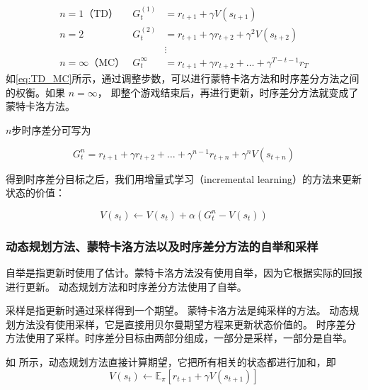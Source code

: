 \begin{equation}
	\label{eq:TD_MC}
	\begin{array}{lcl}
		n=1\text{（TD）} &G_{t}^{(1)}&=r_{t+1}+\gamma V\left(s_{t+1}\right) \\
		n=2 &G_{t}^{(2)}&= r_{t+1}+\gamma r_{t+2}+\gamma^{2} V\left(s_{t+2}\right) \\
		& &\vdots \\
		n=\infty\text{（MC）} &G_{t}^{\infty}&=r_{t+1}+\gamma r_{t+2}+\ldots+\gamma^{T-t-1} r_{T}
	\end{array}
\end{equation}
如\eqref{eq:TD_MC}所示，通过调整步数，可以进行蒙特卡洛方法和时序差分方法之间的权衡。如果 $n=\infty$， 即整个游戏结束后，再进行更新，时序差分方法就变成了蒙特卡洛方法。

$n$步时序差分可写为

\begin{equation}
	G_{t}^{n}=r_{t+1}+\gamma r_{t+2}+\ldots+\gamma^{n-1} r_{t+n}+\gamma^{n} V\left(s_{t+n}\right)
	\label{eq:}
\end{equation}


得到时序差分目标之后，我们用增量式学习（incremental learning）的方法来更新状态的价值：

\begin{equation}
	V\left(s_{t}\right) \leftarrow V\left(s_{t}\right)+\alpha\left(G_{t}^{n}-V\left(s_{t}\right)\right)
	\label{eq:}
\end{equation}

\subsubsection{动态规划方法、蒙特卡洛方法以及时序差分方法的自举和采样} 
自举是指更新时使用了估计。蒙特卡洛方法没有使用自举，因为它根据实际的回报进行更新。
动态规划方法和时序差分方法使用了自举。

采样是指更新时通过采样得到一个期望。
蒙特卡洛方法是纯采样的方法。
动态规划方法没有使用采样，它是直接用贝尔曼期望方程来更新状态价值的。
时序差分方法使用了采样。时序差分目标由两部分组成，一部分是采样，一部分是自举。

如 所示，动态规划方法直接计算期望，它把所有相关的状态都进行加和，即
\begin{equation}
	\label{eq:}
	V\left(s_{t}\right) \leftarrow \mathbb{E}_{\pi}\left[r_{t+1}+\gamma V\left(s_{t+1}\right)\right]
\end{equation}

